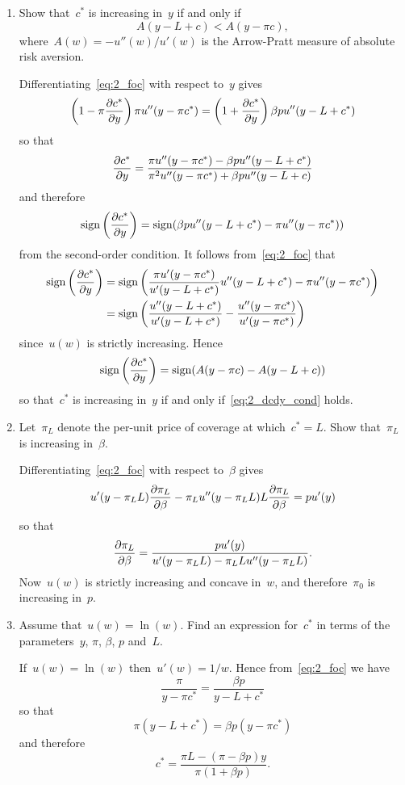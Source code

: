 \begin{enumerate}
\begin{enumerate}
		\item
		Show that~$c^*$ is increasing in~$y$ if and only if
		\[ A(y-L+c)<A(y-\pi c), \label{eq:2_dcdy_cond} \]
		where~$A(w)=-u''(w)/u'(w)$ is the Arrow-Pratt measure of absolute risk aversion.
		\begin{solution}
			Differentiating~\eqref{eq:2_foc} with respect to~$y$ gives
			\[ \left(1-\pi\frac{\partial c^*}{\partial y}\right)\pi u''(y-\pi c^*)=\left(1+\frac{\partial c^*}{\partial y}\right)\beta pu''(y-L+c^*)\]
			so that
			\[ \frac{\partial c^*}{\partial y}=\frac{\pi u''(y-\pi c^*)-\beta pu''(y-L+c^*)}{\pi^2u''(y-\pi c^*)+\beta pu''(y-L+c)} \]
			and therefore
			\[ \operatorname{sign}\left(\frac{\partial c^*}{\partial y}\right)=\operatorname{sign}(\beta pu''(y-L+c^*)-\pi u''(y-\pi c^*))\]
			from the second-order condition.
			It follows from~\eqref{eq:2_foc} that
			\begin{align}
				\operatorname{sign}\left(\frac{\partial c^*}{\partial y}\right)
				&= \operatorname{sign}\left(\frac{\pi u'(y-\pi c^*)}{u'(y-L+c^*)}u''(y-L+c^*)-\pi u''(y-\pi c^*)\right)\\
				&= \operatorname{sign}\left(\frac{u''(y-L+c^*)}{u'(y-L+c^*)}-\frac{u''(y-\pi c^*)}{u'(y-\pi c^*)}\right)
			\end{align}
			since~$u(w)$ is strictly increasing.
			Hence
			\[ \operatorname{sign}\left(\frac{\partial c^*}{\partial y}\right)=\operatorname{sign}(A(y-\pi c)-A(y-L+c)) \]
			so that~$c^*$ is increasing in~$y$ if and only if~\eqref{eq:2_dcdy_cond} holds.
		\end{solution}

		\item
		Let~$\pi_L$ denote the per-unit price of coverage at which~$c^*=L$.
		Show that~$\pi_L$ is increasing in~$\beta$.
		\begin{solution}
			Differentiating~\eqref{eq:2_foc} with respect to~$\beta$ gives
			\[ u'(y-\pi_LL)\frac{\partial\pi_L}{\partial\beta}-\pi_L u''(y-\pi_LL)L\frac{\partial\pi_L}{\partial\beta}=pu'(y) \]
			so that
			\[ \frac{\partial\pi_L}{\partial\beta}=\frac{pu'(y)}{u'(y-\pi_LL)-\pi_LL u''(y-\pi_LL)}. \]
			Now~$u(w)$ is strictly increasing and concave in~$w$, and therefore~$\pi_0$ is increasing in~$p$.
		\end{solution}

		\item
		Assume that~$u(w)=\ln(w)$.
		Find an expression for~$c^*$ in terms of the parameters~$y$, $\pi$, $\beta$, $p$ and~$L$.
		\begin{solution}
			If~$u(w)=\ln(w)$ then~$u'(w)=1/w$.
			Hence from~\eqref{eq:2_foc} we have
			\[ \frac{\pi}{y-\pi c^*}=\frac{\beta p}{y-L+c^*} \]
			so that
			\[ \pi(y-L+c^*)=\beta p(y-\pi c^*) \]
			and therefore
			\[ c^*=\frac{\pi L-(\pi-\beta p)y}{\pi (1+\beta p)}. \]
		\end{solution}

	\end{enumerate}

\end{enumerate}
